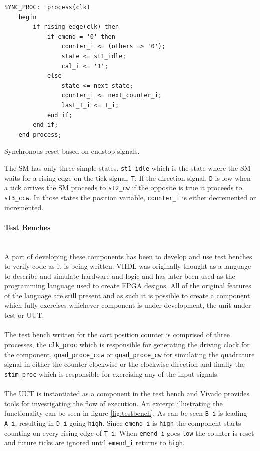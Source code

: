 \begin{listing}[H]
\begin{verbatim}
SYNC_PROC:  process(clk)
	begin
	    if rising_edge(clk) then
	        if emend = '0' then
	            counter_i <= (others => '0');
	            state <= st1_idle;
	            cal_i <= '1';
	        else
	            state <= next_state;
	            counter_i <= next_counter_i;
	            last_T_i <= T_i;
	        end if;
	    end if;
	end process;
\end{verbatim}
\caption{Synchronous reset based on endstop signals.}
\label{code:cart_sync_proc}
\end{listing}

The SM has only three simple states.
\texttt{st1\_idle} which is the state where the SM waits for a rising edge on the tick signal, \texttt{T}.
If the direction signal, \texttt{D} is low when a tick arrives the SM proceeds to \texttt{st2\_cw} if the opposite is true it proceeds to \texttt{st3\_ccw}.
In those states the position variable, \texttt{counter\_i} is either decremented or incremented.

\paragraph{Test Benches}~\\ %
\label{par:test_benches}
A part of developing these components has been to develop and use test benches to verify code as it is being written.
VHDL was originally thought as a language to describe and simulate hardware and logic and has later been used as the programming language used to create FPGA designs.
All of the original features of the language are still present and as such it is possible to create a component which fully exercises whichever component is under development, the unit-under-test or UUT.
\\~\\
The test bench written for the cart position counter is comprised of three processes, the \texttt{clk\_proc} which is responsible for generating the driving clock for the component, \texttt{quad\_proce\_ccw} or \texttt{quad\_proce\_cw} for simulating the quadrature signal in either the counter-clockwise or the clockwise direction and finally the \texttt{stim\_proc} which is responsible for exercising any of the input signals.
\\~\\
The UUT is instantiated as a component in the test bench and Vivado provides tools for investigating the flow of execution.
An excerpt illustrating the functionality can be seen in figure \ref{fig:testbench}.
As can be seen \texttt{B\_i} is leading \texttt{A\_i}, resulting in \texttt{D\_i} going \texttt{high}.
Since \texttt{emend\_i} is \texttt{high} the component starts counting on every rising edge of \texttt{T\_i}.
When \texttt{emend\_i} goes \texttt{low} the counter is reset and future ticks are ignored until \texttt{emend\_i} returns to \texttt{high}.

